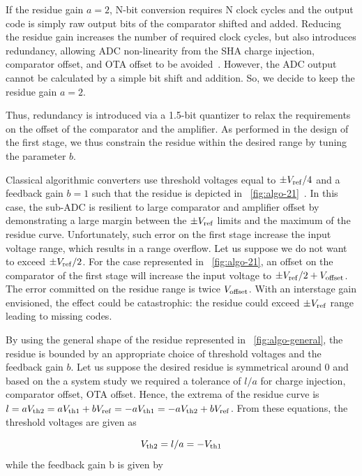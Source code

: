 If the residue gain \(a = 2\), N-bit conversion requires N clock cycles and the output code is simply raw output bits of the comparator shifted and added. Reducing the residue gain increases the number of required clock cycles, but also introduces redundancy, allowing ADC non-linearity from the SHA charge injection, comparator offset, and OTA offset to be avoided~\cite{Lewis1987}. However, the ADC output cannot be calculated by a simple bit shift and addition. So, we decide to keep the residue gain \(a = 2\).

Thus, redundancy is introduced via a 1.5-bit quantizer to relax the requirements on the offset of the comparator and the amplifier. As performed in the design of the first stage, we thus constrain the residue within the desired range by tuning the parameter $b$.

Classical algorithmic converters use threshold voltages equal to \(\pm V_{\rm ref}/4\) and a feedback gain \(b = 1\) such that the residue is depicted in \figurename~\ref{fig:algo-21}~\cite{Brooks2009,Naderi2017}. In this case, the sub-ADC is resilient to large comparator and amplifier offset by demonstrating a large margin between the \(\pm V_{\rm ref}\) limits and the maximum of the residue curve. Unfortunately, such error on the first stage increase the input voltage range, which results in a range overflow. Let us suppose we do not want to exceed $\pm V_{\rm ref}/2$. For the case represented in \figurename~\ref{fig:algo-21}, an offset on the comparator of the first stage will increase the input voltage to $\pm V_{\rm ref}/2+V_{\rm offset}$. The error committed on the residue range is twice $V_{\rm offset}$. With an interstage gain envisioned, the effect could be catastrophic: the residue could exceed $\pm V_{\rm ref}$ range leading to missing codes.

By using the general shape of the residue represented in \figurename~\ref{fig:algo-general}, the residue is bounded by an appropriate choice of threshold voltages and the feedback gain \(b\). Let us suppose the desired residue is symmetrical around 0 and based on the a system study we required a tolerance of \(l/a\) for charge injection, comparator offset, OTA offset. Hence, the extrema of the residue curve is \(l = aV_{\rm th2} = aV_{\rm th1}+bV_{\rm ref} = -aV_{\rm th1} = -aV_{\rm th2}+bV_{\rm ref}\). From these equations, the threshold voltages are given as 

\begin{equation}
V_{\rm th2} = l/a = -V_{\rm th1}
\end{equation}
while the feedback gain b is given by 

